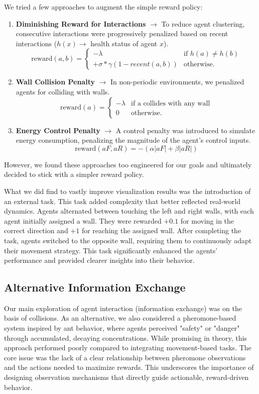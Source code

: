 \documentclass[9pt]{IEEEtran}
\begin{document}
We tried a few approaches to augment the simple reward policy:

\begin{enumerate} 
    \item \textbf{Diminishing Reward for Interactions} $\rightarrow$ To reduce agent clustering, consecutive interactions were progressively penalized based on recent interactions ($h(x)\rightarrow$ health status of agent $x$).
$$
\mathrm{reward}(a, b) = \begin{cases}
    -\lambda & \text{if } h(a) \neq h(b) \\ 
    +\sigma * \gamma (1 - recent(a,b)) & \text{otherwise.}
\end{cases}
$$
    \item \textbf{Wall Collision Penalty} $\rightarrow$ In non-periodic environments, we penalized agents for colliding with walls. 
$$
\mathrm{reward}(a) = \begin{cases}
    -\lambda & \text{if a collides with any wall}\\ 
    0 & \text{otherwise.}
\end{cases}
$$
    \item \textbf{Energy Control Penalty} $\rightarrow$ A control penalty was introduced to simulate energy consumption, penalizing the magnitude of the agent’s control inputs.
$$
\text{reward}(aF, aR) = -(\alpha |aF| + \beta |aR|)
$$
\end{enumerate}

However, we found these approaches too engineered for our goals and ultimately decided to stick with a simpler reward policy.

What we did find to vastly improve visualization results was the introduction of an external task. This task added complexity that better reflected real-world dynamics. Agents alternated between touching the left and right walls, with each agent initially assigned a wall. They were rewarded $+0.1$ for moving in the correct direction and $+1$ for reaching the assigned wall. After completing the task, agents switched to the opposite wall, requiring them to continuously adapt their movement strategy. This task significantly enhanced the agents' performance and provided clearer insights into their behavior.

\subsection{Alternative Information Exchange}

Our main exploration of agent interaction (information exchange) was on the basis of collisions. As an alternative, we also considered a pheromone-based system inspired by ant behavior, where agents perceived "safety" or "danger" through accumulated, decaying concentrations. While promising in theory, this approach performed poorly compared to integrating movement-based tasks. The core issue was the lack of a clear relationship between pheromone observations and the actions needed to maximize rewards. This underscores the importance of designing observation mechanisms that directly guide actionable, reward-driven behavior.
\end{document}
